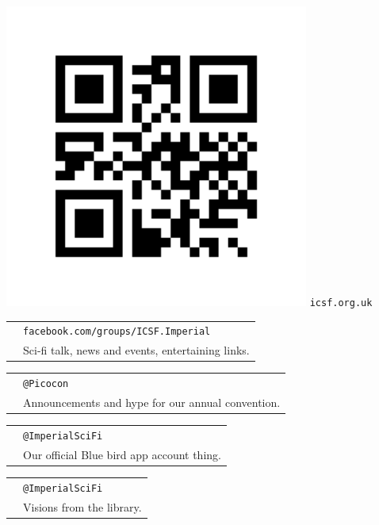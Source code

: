 \newcommand{\socialmedia}[3]{
  \begin{tabular}{r l}
    \multirow{2}{*}{\LARGE {#1}}
    & \texttt{#2} \\[-0.5em]
    & {\footnotesize #3}
  \end{tabular}
}
\begin{minipage}[t]{0.33\textwidth}
  \vspace{-1.3em}
  \begin{center}
  \includegraphics[width=0.75\textwidth]{img/qr-small.png}
  \texttt{icsf.org.uk}
  \end{center}
\end{minipage}
\begin{minipage}[t]{0.4\textwidth}
  \vspace{0em}
  \socialmedia{\faFacebookOfficial}{facebook.com/groups/ICSF.Imperial}{
    Sci-fi talk, news and events, entertaining links.}
  \socialmedia{\faTwitter}{@Picocon}{
    Announcements and hype for our annual convention.}
  \socialmedia{\faTwitter}{@Imperial\textunderscore SciFi}{
    Our official Blue bird app account thing.}
  \socialmedia{\faInstagram}{@Imperial\textunderscore SciFi}{
    Visions from the library.}
\end{minipage}
